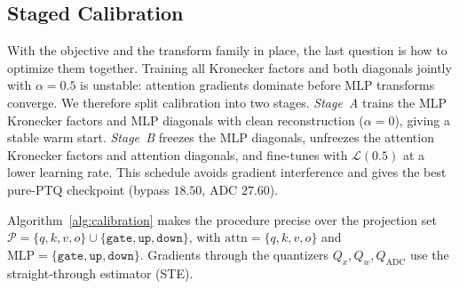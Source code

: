 \documentclass[letterpaper]{article} %
\theoremstyle{plain}
\begin{document}
\subsection{Staged Calibration}

With the objective and the transform family in place, the last question is how to optimize them together. Training all Kronecker factors and both diagonals jointly with $\alpha = 0.5$ is unstable: attention gradients dominate before MLP transforms converge. We therefore split calibration into two stages. \emph{Stage~A} trains the MLP Kronecker factors and MLP diagonals with clean reconstruction ($\alpha = 0$), giving a stable warm start. \emph{Stage~B} freezes the MLP diagonals, unfreezes the attention Kronecker factors and attention diagonals, and fine-tunes with $\mathcal{L}(0.5)$ at a lower learning rate. This schedule avoids gradient interference and gives the best pure-PTQ checkpoint (bypass $18.50$, ADC $27.60$).

Algorithm~\ref{alg:calibration} makes the procedure precise over the projection set $\mathcal{P}=\{q,k,v,o\}\cup\{\texttt{gate},\texttt{up},\texttt{down}\}$, with $\mathrm{attn}=\{q,k,v,o\}$ and $\mathrm{MLP}=\{\texttt{gate},\texttt{up},\texttt{down}\}$. Gradients through the quantizers $Q_x,Q_w,Q_{\mathrm{ADC}}$ use the straight-through estimator (STE).
\end{document}
